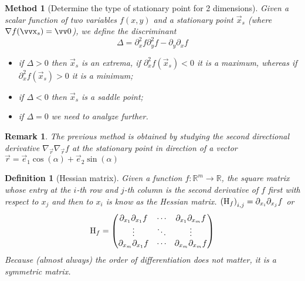 \documentclass[twocolumn, margin=normal]{tex/hsrzf}
\theoremstyle{fuvarzf}
\newtheorem{method}{Method}
\newtheorem{definition}{Definition}
\newtheorem{remark}{Remark}
\begin{document}
\begin{method}[Determine the type of stationary point for 2 dimensions]
  Given a scalar function of two variables \(f(x,y)\) and a stationary point
  \(\vec{x}_s\) (where \(\grad f(\vec{x}_s) = \vec{0}\)), we define the
  \emph{discriminant}
  \[
    \Delta = \partial_x^2 f \partial_y^2 f - \partial_y \partial_x f
  \]
  \begin{itemize}
    \item if \(\Delta > 0\) then \(\vec{x}_s\) is an extrema, if \(\partial_x^2
      f(\vec{x}_s) < 0\) it is a maximum, whereas if \(\partial_x^2
      f(\vec{x}_s) > 0\) it is a minimum;

    \item if \(\Delta < 0\) then \(\vec{x}_s\) is a saddle point;

    \item if \(\Delta = 0\) we need to analyze further.
  \end{itemize}
\end{method}

\begin{remark}
  The previous method is obtained by studying the second directional derivative
  \(\nabla_\vec{r}\nabla_\vec{r} f\) at the stationary point in direction of a
  vector \(\vec{r} = \vec{e}_1\cos(\alpha) + \vec{e}_2\sin(\alpha)\)
\end{remark}

\begin{definition}[Hessian matrix]
  Given a function \(f: \mathbb{R}^m \to \mathbb{R}\), the square matrix whose
  entry at the \(i\)-th row and \(j\)-th column is the second derivative of
  \(f\) first with respect to \(x_j\) and then to \(x_i\) is know as the
  \emph{Hessian} matrix.
  \(
    \left(\mathrm{H}_f\right)_{i,j} = \partial_{x_i}\partial_{x_j} f
  \)
  or
  \[
    \mathrm{H}_f = \begin{pmatrix}
      \partial_{x_1}\partial_{x_1} f & \cdots & \partial_{x_1}\partial_{x_m} f \\
      \vdots & \ddots & \vdots \\
      \partial_{x_m}\partial_{x_1} f & \cdots & \partial_{x_m}\partial_{x_m} f \\
    \end{pmatrix}
  \]
  Because (almost always) the order of differentiation
  does not matter, it is a symmetric matrix.
\end{definition}
\end{document}
